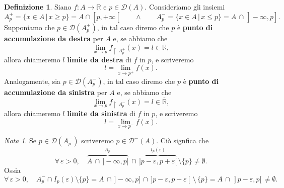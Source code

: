 \documentclass{article}
\theoremstyle{plain}
\theoremstyle{definition}
\newtheorem{defn}{Definizione}[section]
\theoremstyle{remark}
\newtheorem{note}{Nota}
\begin{document}
\begin{bxthm}
\begin{defn}
    Siano $f:A\to\mathbb{R}$ e $p\in\mathcal{D}(A)$.
    Consideriamo gli insiemi 
    \[A^+_p=\{x\in A \,|\, x\geq p\}=A\cap [p,+\infty[\quad\quad\land\quad\quad A^-_p=\{x\in A \,|\, x\leq p\}=A\,\cap\, ]-\infty,p].\]
    Supponiamo che $p\in \mathcal{D}(A^+_p)$, in tal caso diremo che $p$ è \textbf{punto di accumulazione da destra} per $A$ 
    e, se abbiamo che 
    \[\lim_{x\to p}f_{\upharpoonright \  A^+_p}(x)=l\in\overline{\mathbb{R}},\]
    allora chiameremo $l$ \textbf{limite da destra} di $f$ in $p$, e scriveremo \[l=\lim_{x\to p^+}f(x).\]
    Analogamente, sia $p\in \mathcal{D}(A^-_p)$, in tal caso diremo che $p$ è \textbf{punto di accumulazione da sinistra} per $A$ 
    e, se abbiamo che 
    \[\lim_{x\to p}f_{\upharpoonright \  A^-_p}(x)=l\in\overline{\mathbb{R}},\]
    allora chiameremo $l$ \textbf{limite da sinistra} di $f$ in $p$, e scriveremo \[l=\lim_{x\to p^-}f(x).\]
\end{defn}
\end{bxthm}

\vspace{10pt}

\begin{note}
    Se $p\in\mathcal{D}(A^-_p)$ scriveremo $p\in\mathcal{D}^-(A)$. Ciò signfica che 
    \[\forall\,\varepsilon>0,\quad \overbrace{A\,\cap\,]-\infty,p]}^{A^-_p}\,\cap\,\overbrace{]p-\varepsilon,p+\varepsilon[}^{I_p(\varepsilon)}\,\setminus\{p\}\neq\emptyset.\]
    Ossia
    \[ \forall\,\varepsilon>0,\quad A^-_p\cap I_p(\varepsilon)\setminus\{p\}=A\,\cap\, ]-\infty,p]\,\cap\,]p-\varepsilon,p+\varepsilon[\,\setminus\,\{p\}=A\,\cap\,]p-\varepsilon,p[\,\neq\emptyset. \]    
\end{note}

\vspace{10pt}
\end{document}

